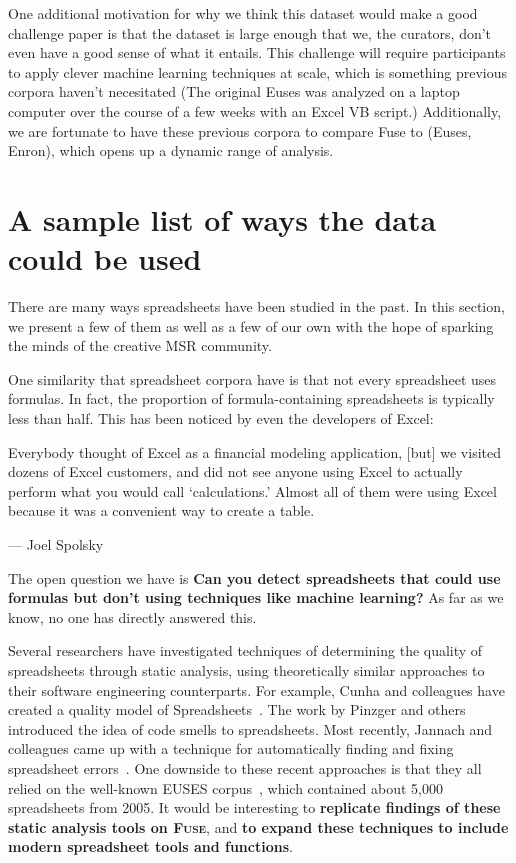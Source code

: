 \documentclass[conference]{IEEEtran}
\begin{document}
One additional motivation for why we think this dataset would make a good challenge paper is that the dataset is large enough that we, the curators, don't even have a good sense of what it entails.
This challenge will require participants to apply clever machine learning techniques at scale, which is something previous corpora haven't necesitated (The original Euses was analyzed on a laptop computer over the course of a few weeks with an Excel VB script.)
Additionally, we are fortunate to have these previous corpora to compare Fuse to (Euses, Enron), which opens up a dynamic range of analysis.


\section{A sample list of ways the data could be used}
\label{how_to_use_fuse}
There are many ways spreadsheets have been studied in the past.  
In this section, we present a few of them as well as a few of our own with the hope of sparking the minds of the creative MSR community.

One similarity that spreadsheet corpora have is that not every spreadsheet uses formulas.  
In fact, the proportion of formula-containing spreadsheets is typically less than half.
This has been noticed by even the developers of Excel:
\begin{displayquote}
Everybody thought of Excel as a financial modeling application, [but] we visited dozens of Excel customers, and did not see anyone using Excel to actually perform what you would call `calculations.' Almost all of them were using Excel because it was a convenient way to create a table.

 --- Joel Spolsky~\cite{JoelOnSoftware}
\end{displayquote}
The open question we have is \textbf{Can you detect spreadsheets that could use formulas but don't using techniques like machine learning?}
As far as we know, no one has directly answered this.

Several researchers have investigated techniques of determining the quality of spreadsheets through static analysis, using theoretically similar approaches to their software engineering counterparts.
For example, Cunha and colleagues have created a quality model of Spreadsheets~\cite{Cunha2012}.
The work by Pinzger and others introduced the idea of code smells to spreadsheets\cite{Pinzger2012}.
Most recently, Jannach and colleagues came up with a technique for automatically finding and fixing spreadsheet errors~\cite{jannach2014}.
One downside to these recent approaches is that they all relied on the well-known EUSES corpus~\cite{Fisher2005}, which contained about 5,000 spreadsheets from 2005.
It would be interesting to \textbf{replicate findings of these static analysis tools on \textsc{Fuse}}, and \textbf{to expand these techniques to include modern spreadsheet tools and functions}.
\end{document}
